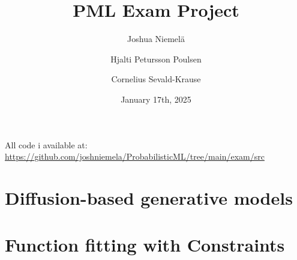 \documentclass{article}
\begin{document}
\title{PML Exam Project}
\author{
  Joshua Niemelä
  \and
  Hjalti Petursson Poulsen
  \and
  Cornelius Sevald-Krause
}
\date{January 17th, 2025}
\maketitle

All code i available at: \url{https://github.com/joshniemela/ProbabilisticML/tree/main/exam/src}

\section{Diffusion-based generative models}


\section{Function fitting with Constraints}


\printbibliography

\appendix

\end{document}

